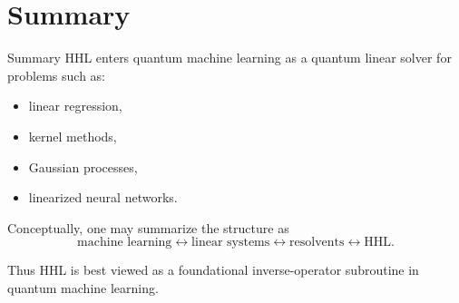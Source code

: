 \documentclass{beamer}
\begin{document}
\section{Summary}

\begin{frame}{Summary}
HHL enters quantum machine learning as a quantum linear solver for problems such as:
\begin{itemize}
\item linear regression,
\item kernel methods,
\item Gaussian processes,
\item linearized neural networks.
\end{itemize}

Conceptually, one may summarize the structure as
\[
\text{machine learning}
\longleftrightarrow
\text{linear systems}
\longleftrightarrow
\text{resolvents}
\longleftrightarrow
\text{HHL}.
\]

Thus HHL is best viewed as a foundational inverse-operator subroutine in quantum machine learning.
\end{frame}
\end{document}
